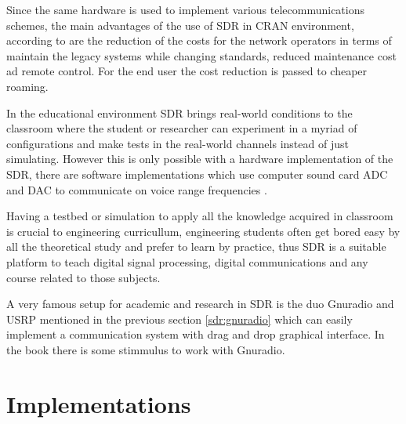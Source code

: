 Since the same hardware is used to implement various telecommunications schemes,
the main advantages of the use of SDR in CRAN environment, according to
\cite{dayananda2012} are the reduction of the costs for the network operators in
terms of maintain the legacy systems while changing standards, reduced
maintenance cost ad remote control. For the end user the cost reduction is
passed to cheaper roaming.




In the educational environment SDR brings real-world conditions to the classroom
where the student or researcher can experiment in a myriad of configurations and
make tests in the real-world channels instead of just simulating. However this
is only possible with a hardware implementation of the SDR, there are software
implementations which use computer sound card ADC and DAC to communicate on
voice range frequencies \cite{ladimer2009}.

Having a testbed or simulation to apply all the knowledge acquired in classroom
is crucial to engineering curricullum, engineering students often get bored easy
by all the theoretical study and prefer to learn by practice, thus SDR is a
suitable platform to teach digital signal processing, digital communications and
any course related to those subjects.

A very famous setup for academic and research in SDR is the duo Gnuradio
\cite{web:gnuradio} and USRP \cite{web:usrp} mentioned in the previous section
\ref{sdr:gnuradio} which can easily implement a communication system with drag
and drop graphical interface. In the book \cite{akbook} there is some stimmulus
to work with Gnuradio.


\section{Implementations}
\label{sdr:implement}

